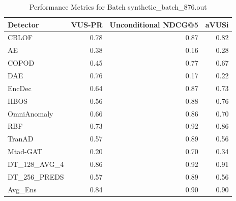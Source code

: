 \begin{table}
\centering
\caption{Performance Metrics for Batch synthetic_batch_876.out}
\label{tab:example_metrics}
\begin{tabular}{lrrr}
\toprule
    Detector &  VUS-PR &  Unconditional NDCG@5 &  aVUSi \\
\midrule
       CBLOF &    0.78 &                  0.87 &   0.82 \\
          AE &    0.38 &                  0.16 &   0.28 \\
       COPOD &    0.45 &                  0.77 &   0.67 \\
         DAE &    0.76 &                  0.17 &   0.22 \\
      EncDec &    0.64 &                  0.87 &   0.73 \\
        HBOS &    0.56 &                  0.88 &   0.76 \\
 OmniAnomaly &    0.66 &                  0.86 &   0.70 \\
         RBF &    0.73 &                  0.92 &   0.86 \\
      TranAD &    0.57 &                  0.89 &   0.56 \\
    Mtad-GAT &    0.20 &                  0.70 &   0.34 \\
DT\_128\_AVG\_4 &    0.86 &                  0.92 &   0.91 \\
DT\_256\_PREDS &    0.57 &                  0.89 &   0.56 \\
     Avg\_Ens &    0.84 &                  0.90 &   0.90 \\
\bottomrule
\end{tabular}
\end{table}
